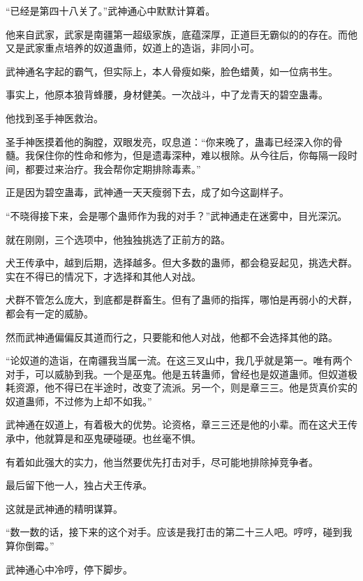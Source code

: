 
\begin{this_body}



“已经是第四十八关了。”武神通心中默默计算着。

他来自武家，武家是南疆第一超级家族，底蕴深厚，正道巨无霸似的的存在。而他又是武家重点培养的奴道蛊师，奴道上的造诣，非同小可。

武神通名字起的霸气，但实际上，本人骨瘦如柴，脸色蜡黄，如一位病书生。

事实上，他原本狼背蜂腰，身材健美。一次战斗，中了龙青天的碧空蛊毒。

他找到圣手神医救治。

圣手神医摸着他的胸膛，双眼发亮，叹息道：“你来晚了，蛊毒已经深入你的骨髓。我保住你的性命和修为，但是遗毒深种，难以根除。从今往后，你每隔一段时间，都要过来治疗。我会帮你定期排除毒素。”

正是因为碧空蛊毒，武神通一天天瘦弱下去，成了如今这副样子。

“不晓得接下来，会是哪个蛊师作为我的对手？”武神通走在迷雾中，目光深沉。

就在刚刚，三个选项中，他独独挑选了正前方的路。

犬王传承中，越到后期，选择越多。但大多数的蛊师，都会稳妥起见，挑选犬群。实在不得已的情况下，才选择和其他人对战。

犬群不管怎么庞大，到底都是群畜生。但有了蛊师的指挥，哪怕是再弱小的犬群，都会有一定的威胁。

然而武神通偏偏反其道而行之，只要能和他人对战，他都不会选择其他的路。

“论奴道的造诣，在南疆我当属一流。在这三叉山中，我几乎就是第一。唯有两个对手，可以威胁到我。一个是巫鬼。他是五转蛊师，曾经也是奴道蛊师。但奴道极耗资源，他不得已在半途时，改变了流派。另一个，则是章三三。他是货真价实的奴道蛊师，不过修为上却不如我。”

武神通在奴道上，有着极大的优势。论资格，章三三还是他的小辈。而在这犬王传承中，他就算是和巫鬼硬碰硬。也丝毫不惧。

有着如此强大的实力，他当然要优先打击对手，尽可能地排除掉竞争者。

最后留下他一人，独占犬王传承。

这就是武神通的精明谋算。

“数一数的话，接下来的这个对手。应该是我打击的第二十三人吧。哼哼，碰到我算你倒霉。”

武神通心中冷哼，停下脚步。


\end{this_body}

